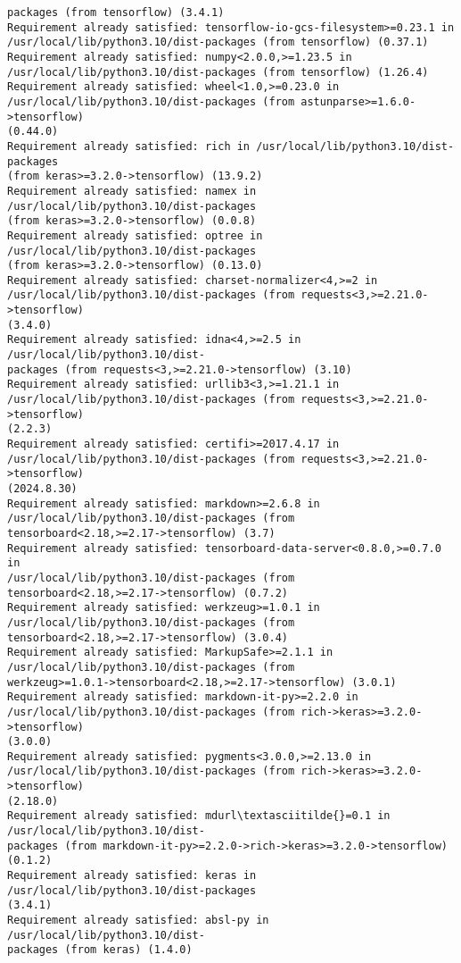 \documentclass[11pt]{article}
\begin{document}
\begin{Verbatim}[commandchars=\\\{\}]
packages (from tensorflow) (3.4.1)
Requirement already satisfied: tensorflow-io-gcs-filesystem>=0.23.1 in
/usr/local/lib/python3.10/dist-packages (from tensorflow) (0.37.1)
Requirement already satisfied: numpy<2.0.0,>=1.23.5 in
/usr/local/lib/python3.10/dist-packages (from tensorflow) (1.26.4)
Requirement already satisfied: wheel<1.0,>=0.23.0 in
/usr/local/lib/python3.10/dist-packages (from astunparse>=1.6.0->tensorflow)
(0.44.0)
Requirement already satisfied: rich in /usr/local/lib/python3.10/dist-packages
(from keras>=3.2.0->tensorflow) (13.9.2)
Requirement already satisfied: namex in /usr/local/lib/python3.10/dist-packages
(from keras>=3.2.0->tensorflow) (0.0.8)
Requirement already satisfied: optree in /usr/local/lib/python3.10/dist-packages
(from keras>=3.2.0->tensorflow) (0.13.0)
Requirement already satisfied: charset-normalizer<4,>=2 in
/usr/local/lib/python3.10/dist-packages (from requests<3,>=2.21.0->tensorflow)
(3.4.0)
Requirement already satisfied: idna<4,>=2.5 in /usr/local/lib/python3.10/dist-
packages (from requests<3,>=2.21.0->tensorflow) (3.10)
Requirement already satisfied: urllib3<3,>=1.21.1 in
/usr/local/lib/python3.10/dist-packages (from requests<3,>=2.21.0->tensorflow)
(2.2.3)
Requirement already satisfied: certifi>=2017.4.17 in
/usr/local/lib/python3.10/dist-packages (from requests<3,>=2.21.0->tensorflow)
(2024.8.30)
Requirement already satisfied: markdown>=2.6.8 in
/usr/local/lib/python3.10/dist-packages (from
tensorboard<2.18,>=2.17->tensorflow) (3.7)
Requirement already satisfied: tensorboard-data-server<0.8.0,>=0.7.0 in
/usr/local/lib/python3.10/dist-packages (from
tensorboard<2.18,>=2.17->tensorflow) (0.7.2)
Requirement already satisfied: werkzeug>=1.0.1 in
/usr/local/lib/python3.10/dist-packages (from
tensorboard<2.18,>=2.17->tensorflow) (3.0.4)
Requirement already satisfied: MarkupSafe>=2.1.1 in
/usr/local/lib/python3.10/dist-packages (from
werkzeug>=1.0.1->tensorboard<2.18,>=2.17->tensorflow) (3.0.1)
Requirement already satisfied: markdown-it-py>=2.2.0 in
/usr/local/lib/python3.10/dist-packages (from rich->keras>=3.2.0->tensorflow)
(3.0.0)
Requirement already satisfied: pygments<3.0.0,>=2.13.0 in
/usr/local/lib/python3.10/dist-packages (from rich->keras>=3.2.0->tensorflow)
(2.18.0)
Requirement already satisfied: mdurl\textasciitilde{}=0.1 in /usr/local/lib/python3.10/dist-
packages (from markdown-it-py>=2.2.0->rich->keras>=3.2.0->tensorflow) (0.1.2)
Requirement already satisfied: keras in /usr/local/lib/python3.10/dist-packages
(3.4.1)
Requirement already satisfied: absl-py in /usr/local/lib/python3.10/dist-
packages (from keras) (1.4.0)

\end{Verbatim}
\end{document}
